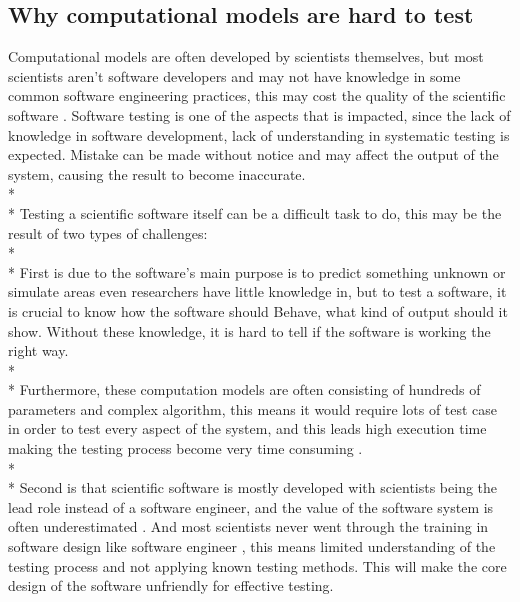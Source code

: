 \subsection{Why computational models are hard to test}
Computational models are often developed by scientists themselves, but most scientists aren’t software developers and may not have knowledge in some common software engineering practices, this may cost the quality of the scientific software \cite{Reference10}. Software testing is one of the aspects that is impacted, since the lack of knowledge in software development, lack of understanding in systematic testing is expected. Mistake can be made without notice and may affect the output of the system, causing the result to become inaccurate.\\*\\*
Testing a scientific software itself can be a difficult task to do, this may be the result of two types of challenges: \\*\\*
First is due to the software’s main purpose is to predict something unknown or simulate areas even researchers have little knowledge in, but to test a software, it is crucial to know how the software should Behave, what kind of output should it show. 
Without these knowledge, it is hard to tell if the software is working the right way. \\*\\*
Furthermore, these computation models are often consisting of hundreds of parameters and complex algorithm, this means it would require lots of test case in order to test every aspect of the system, and this leads high execution time making the testing process become very time consuming \cite{Reference10}.\\*\\*
Second is that scientific software is mostly developed with scientists being the lead role instead of a software engineer, and the value of the software system is often underestimated \cite{Reference10}. And most scientists never went through the training in software design like software engineer \cite{Reference11}, this means limited understanding of the testing process and not applying known testing methods. This will make the core design of the software unfriendly for effective testing.

